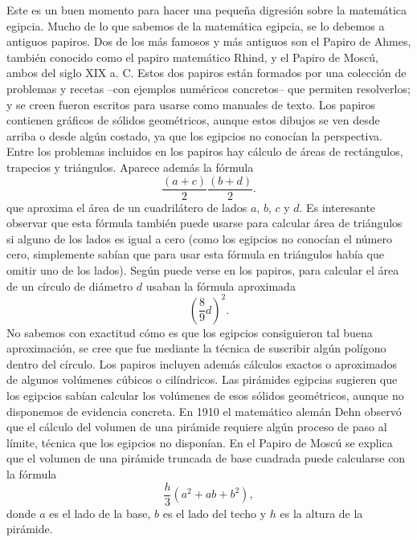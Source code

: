 Este es un buen momento para hacer una pequeña digresión sobre la matemática
egipcia. Mucho de lo que sabemos de la matemática egipcia, se lo debemos a
antiguos papiros. Dos de los más famosos y más antiguos son el Papiro de Ahmes,
también conocido como el papiro matemático Rhind, y el Papiro de Moscú, ambos
del siglo XIX a. C. Estos dos papiros están formados por una colección de
problemas y recetas --con ejemplos numéricos concretos-- que permiten
resolverlos; y se creen fueron escritos para usarse como manuales de texto. Los
papiros contienen gráficos de sólidos geométricos, aunque  estos dibujos se ven
desde arriba o desde algún costado, ya que los egipcios no conocían la
perspectiva.  Entre los problemas incluidos en los papiros hay cálculo de áreas
de rectángulos, trapecios y triángulos. Aparece además la fórmula 
\[
	\frac{(a+c)}{2}\frac{(b+d)}{2}.
\]
que aproxima el área de un cuadrilátero de lados $a$, $b$, $c$ y $d$.  Es
interesante observar que esta fórmula también puede usarse para calcular área
de triángulos si alguno de los lados es igual a cero (como los egipcios no
conocían el número cero, simplemente sabían que para usar esta fórmula en
triángulos había que omitir uno de los lados). Según puede verse en los
papiros, para calcular el área de un círculo de diámetro $d$ usaban la
fórmula aproximada 
\begin{equation}
	\label{eq:egipcio_circle}
	\left(\frac89d\right)^2.
\end{equation}
No sabemos con exactitud cómo es que los egipcios consiguieron tal buena
aproximación, se cree que fue mediante la técnica de suscribir algún polígono
dentro del círculo.  Los papiros incluyen además cálculos exactos o aproximados
de algunos volúmenes cúbicos o cilíndricos.  Las pirámides egipcias sugieren
que los egipcios sabían calcular los volúmenes de esos sólidos geométricos,
aunque no disponemos de evidencia concreta. En 1910 el matemático alemán Dehn
observó que el cálculo del volumen de una pirámide requiere algún proceso de
paso al límite, técnica que los egipcios no disponían.  En el Papiro de Moscú
se explica que el volumen de una pirámide truncada de base cuadrada puede
calcularse con la fórmula
\[
	\frac{h}{3}(a^2+ab+b^2),
\]
donde $a$ es el lado de la base, $b$ es el lado del techo y $h$ es la altura de
la pirámide. 

